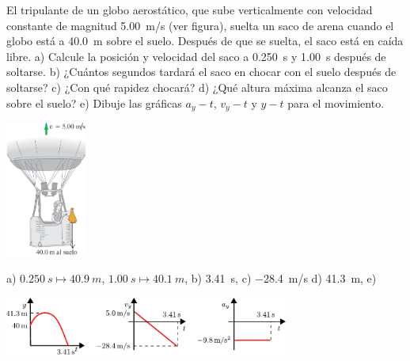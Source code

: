 \documentclass[11pt]{article}
\begin{document}
\begin{exercise}
    \begin{multicols}{2}
        El tripulante de un globo aerostático, que sube verticalmente con velocidad constante de magnitud \qty{5.00}{m/s} (ver figura), suelta un saco de arena cuando el globo está a \qty{40.0}{m} sobre el suelo. Después de que se suelta, el saco está en caída libre. a) Calcule la posición y velocidad del saco a \qty{0.250}{s} y \qty{1.00}{s} después de soltarse. b) ¿Cuántos segundos tardará el saco en chocar con el suelo después de soltarse? c) ¿Con qué rapidez chocará? d) ¿Qué altura máxima alcanza el saco sobre el suelo? e) Dibuje las gráficas $a_y - t$, $v_y - t$ y $y - t$ para el movimiento.
\begin{center}
    \includegraphics[width=0.2\textwidth]{figs/activ-12.png}
\end{center}
    \end{multicols}
\end{exercise}
\begin{solution}
    a) $\qty{0.250}{s} \mapsto \qty{40.9}{m}$, $\qty{1.00}{s} \mapsto \qty{40.1}{m}$, b) \qty{3.41}{s}, c) \qty{-28.4}{m/s} d) \qty{41.3}{m}, e)
\begin{center}
    \includegraphics[width=0.7\textwidth]{figs/ac-12.pdf}
\end{center}
\end{solution}
\end{document}
